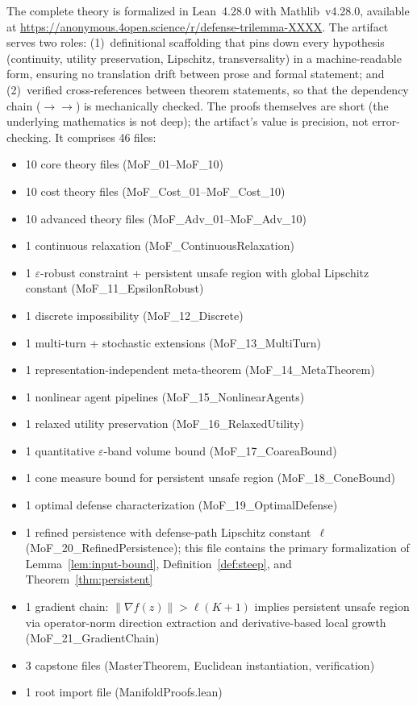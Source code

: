 \documentclass[11pt]{article}
\begin{document}
The complete theory is formalized in Lean~4.28.0 with Mathlib~v4.28.0,
available at
\url{https://anonymous.4open.science/r/defense-trilemma-XXXX}.
The artifact serves two roles: (1)~definitional scaffolding that
pins down every hypothesis (continuity, utility preservation,
Lipschitz, transversality) in a machine-readable form, ensuring
no translation drift between prose and formal statement; and
(2)~verified cross-references between theorem statements, so that
the dependency chain
($\to$$\to$)
is mechanically checked.
The proofs themselves are short (the underlying mathematics is not
deep); the artifact's value is precision, not error-checking.
It comprises 46 files:
\begin{itemize}[nosep]
  \item 10 core theory files (MoF\_01--MoF\_10)
  \item 10 cost theory files (MoF\_Cost\_01--MoF\_Cost\_10)
  \item 10 advanced theory files (MoF\_Adv\_01--MoF\_Adv\_10)
  \item 1 continuous relaxation (MoF\_ContinuousRelaxation)
  \item 1 $\varepsilon$-robust constraint + persistent unsafe region
    with global Lipschitz constant
    (MoF\_11\_EpsilonRobust)
  \item 1 discrete impossibility (MoF\_12\_Discrete)
  \item 1 multi-turn + stochastic extensions
    (MoF\_13\_MultiTurn)
  \item 1 representation-independent meta-theorem
    (MoF\_14\_MetaTheorem)
  \item 1 nonlinear agent pipelines (MoF\_15\_NonlinearAgents)
  \item 1 relaxed utility preservation (MoF\_16\_RelaxedUtility)
  \item 1 quantitative $\varepsilon$-band volume bound
    (MoF\_17\_CoareaBound)
  \item 1 cone measure bound for persistent unsafe region
    (MoF\_18\_ConeBound)
  \item 1 optimal defense characterization
    (MoF\_19\_OptimalDefense)
  \item 1 refined persistence with defense-path Lipschitz constant~$\ell$
    (MoF\_20\_RefinedPersistence); this file contains the primary
    formalization of Lemma~\ref{lem:input-bound},
    Definition~\ref{def:steep}, and Theorem~\ref{thm:persistent}
  \item 1 gradient chain: $\|\nabla f(z)\| > \ell(K+1)$ implies
    persistent unsafe region via operator-norm direction extraction
    and derivative-based local growth
    (MoF\_21\_GradientChain)
  \item 3 capstone files (MasterTheorem, Euclidean instantiation,
    verification)
  \item 1 root import file (ManifoldProofs.lean)
\end{itemize}


\end{document}
